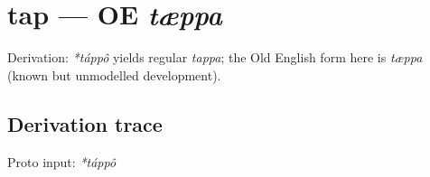 \documentclass[
  british,
  a4paper,
  openany]{book}
\providecommand{\texorpdfstring}[2]{#1}
\begin{document}
\section{\texorpdfstring{tap --- OE
\emph{tæppa}}{tap --- OE tæppa}}\label{tap-oe-tuxe6ppa}


Derivation: \emph{*táppô} yields regular \emph{tappa}; the Old English
form here is \emph{tæppa} (known but unmodelled development).

\subsection{Derivation trace}\label{derivation-trace-140}

Proto input: \emph{*táppô}

\begingroup
\setlength{\fboxsep}{6pt}
\end{document}
